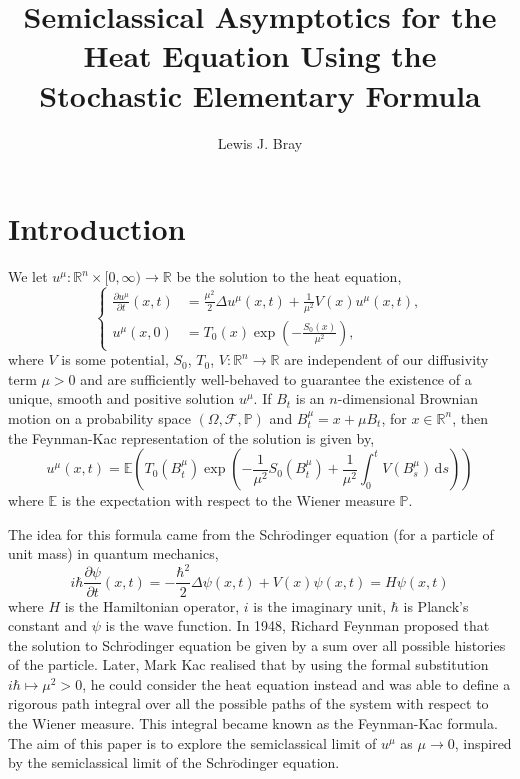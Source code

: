 \documentclass[a4paper,12pt,draft]{report}
\begin{document}
\title{Semiclassical Asymptotics for the Heat Equation Using the Stochastic Elementary Formula}
\author{Lewis J. Bray}

\maketitle

\tableofcontents

\chapter{Introduction}

We let $u^\mu : \mathbb{R}^n \times [0, \infty) \to \mathbb{R}$ be the solution to the heat equation,
$$
\left\{
\begin{aligned}
\frac{\partial u^\mu}{\partial t}(x, t) & = \frac{\mu^2}{2}\Delta u^\mu(x, t) + \frac{1}{\mu^2}V(x)u^\mu(x, t),\\
u^\mu(x, 0) & = T_0(x)\exp\left(-\frac{S_0(x)}{\mu^2}\right),
\end{aligned}
\right.
$$
where $V$ is some potential, $S_0$, $T_0$, $V : \mathbb{R}^n \to \mathbb{R}$ are independent of our diffusivity term $\mu > 0$ and are sufficiently well-behaved to guarantee the existence of a unique, smooth and positive solution $u^\mu$.  If $B_t$ is an $n$-dimensional Brownian motion on a probability space $(\Omega, \mathscr{F}, \mathbb{P})$ and $B_t^\mu = x + \mu B_t$, for $x \in \mathbb{R}^n$, then the Feynman-Kac representation of the solution is given by,
$$
u^\mu(x, t) = \mathbb{E}\left(T_0(B_t^\mu)\exp\left(-\frac{1}{\mu^2}S_0(B_t^\mu) + \frac{1}{\mu^2}\int_0^tV(B_s^\mu)\,\mathrm{d}s\right)\right)
$$
where $\mathbb{E}$ is the expectation with respect to the Wiener measure $\mathbb{P}$.

The idea for this formula came from the Schr$\ddot{\text{o}}$dinger equation (for a particle of unit mass) in quantum mechanics,
$$
i\hbar\frac{\partial\psi}{\partial t}(x, t) = -\frac{\hbar^2}{2}\Delta\psi(x, t) + V(x)\psi(x, t) = H\psi(x, t)
$$
where $H$ is the Hamiltonian operator, $i$ is the imaginary unit, $\hbar$ is Planck's constant and $\psi$ is the wave function.  In 1948, Richard Feynman proposed that the solution to Schr$\ddot{\text{o}}$dinger equation be given by a sum over all possible histories of the particle.  Later, Mark Kac realised that by using the formal substitution $i\hbar \mapsto \mu^2 > 0$, he could consider the heat equation instead and was able to define a rigorous path integral over all the possible paths of the system with respect to the Wiener measure.  This integral became known as the Feynman-Kac formula.  The aim of this paper is to explore the semiclassical limit of $u^\mu$ as $\mu \to 0$, inspired by the semiclassical limit of the Schr$\ddot{\text{o}}$dinger equation.
\end{document}
